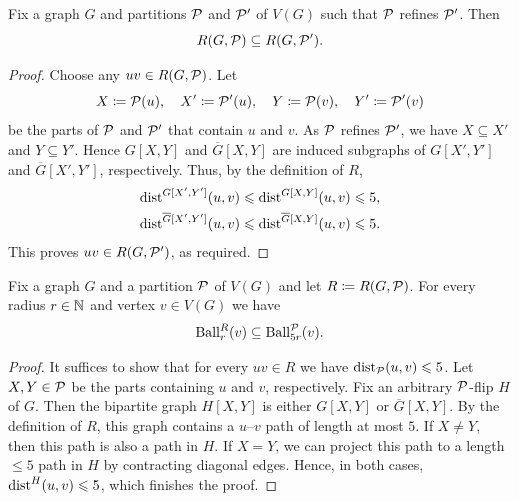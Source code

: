 \begin{lemma}\label{lem:monotoneR}
    Fix a graph $G$ and partitions $\mathcal P$ and $\mathcal P'$ of $V(G)$ such that $\mathcal P$ refines $\mathcal P'$. Then $$R(G,\mathcal P)\subseteq R(G, \mathcal P').$$
\end{lemma}
\begin{proof}
    Choose any $uv \in R(G,\mathcal P)$. Let
    \[
        X \coloneqq \mathcal P(u), \quad
        X' \coloneqq \mathcal P'(u), \quad
        Y \coloneqq \mathcal P(v), \quad
        Y' \coloneqq \mathcal P'(v)
    \]
    be the parts of $\mathcal P$ and $\mathcal P'$ that contain $u$ and $v$.
    As $\mathcal P$ refines $\mathcal P'$, we have $X \subseteq X'$ and $Y \subseteq Y'$.
    Hence $G[X,Y]$ and $\overline G[X,Y]$ are induced subgraphs of $G[X',Y']$ and $\overline G[X',Y']$, respectively.
    Thus, by the definition of $R$,
    \begin{align*}
        \mathrm{dist}^{G[X',Y']}(u,v) &\leqslant \mathrm{dist}^{G[X,Y]}(u,v) \leqslant 5,\\
        \mathrm{dist}^{\overline G[X',Y']}(u,v) &\leqslant \mathrm{dist}^{\overline G[X,Y]}(u,v) \leqslant 5.
    \end{align*}
    This proves $uv \in R(G, \mathcal P')$, as required.
\end{proof}

\begin{lemma}\label{lem:ballContainment}
    Fix a graph $G$ and a partition $\mathcal P$ of $V(G)$ and let $R \coloneqq R(G,\mathcal P)$. For every radius $r \in \mathbb N$ and vertex $v \in V(G)$ we have
    \[
        \operatorname{Ball}^R_r(v) \subseteq \operatorname{Ball}^\mathcal P_{5r}(v).
    \]
\end{lemma}

\begin{proof}
    It suffices to show that for every $uv \in R$ we have $\mathrm{dist}_\mathcal P(u,v) \leqslant 5$.
    Let $X,Y\in\mathcal P$ be the parts containing $u$ and $v$, respectively. Fix an arbitrary $\mathcal P$-flip $H$ of $G$.
    Then the bipartite graph $H[X,Y]$ is either $G[X,Y]$ or $\overline G[X,Y]$.
    By the definition of $R$, this graph contains a $u$--$v$ path of length at most $5$.
    If $X \neq Y$, then this path is also a path in $H$.
    If $X = Y$, we can project this path to a length ${\leq}5$ path in $H$ by contracting diagonal edges. Hence, in both cases,
    $\mathrm{dist}^H(u,v) \leqslant 5$, which finishes the proof.
\end{proof}


